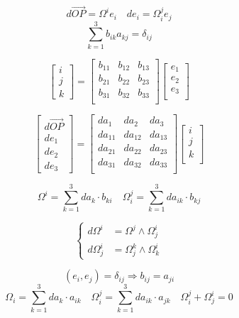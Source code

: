 \documentclass[12pt,a4paper]{article}
\begin{document}
\[
d\overrightarrow{OP} = \Omega^ie_i \quad de_i = \Omega^j_ie_j
\]
\[
\sum_{k = 1} ^3 b_{ik}a_{kj} = \delta_{ij}
\]

\[
\left[
\begin{array}{c}
i \\ j \\ k
\end{array}
\right] = \left[
\begin{array}{ccc}
b_{11} & b_{12} & b_{13} \\
b_{21} & b_{22} & b_{23} \\
b_{31} & b_{32} & b_{33} \\
\end{array}
\right] \left[
\begin{array}{c}
e_1\\e_2\\e_3\\
\end{array}
\right]
\]

\[
\left[
\begin{array}{c}
d\overrightarrow{OP} \\ de_1 \\de_2 \\de_3
\end{array}
\right] = \left[
\begin{array}{ccc}
da_1 & da_2 & da_3 \\
da_{11} & da_{12} & da_{13} \\
da_{21} & da_{22} & da_{23} \\
da_{31} & da_{32} & da_{33} \\
\end{array}
\right] \left[
\begin{array}{c}
i \\j\\k\\
\end{array}
\right]
\]

\[
\Omega^i = \sum_{k = 1}^3 da_{k} \cdot b_{ki}
\quad
\Omega_i^j = \sum_{k = 1}^3 da_{ik}\cdot b_{kj}
\]

\[
\begin{cases}
d\Omega^i & =  \Omega^j \wedge \Omega^i_j \\
d\Omega^i_j &=  \Omega^k_j \wedge \Omega^i_k
\end{cases}
\]

\[
(e_i,e_j) = \delta_{ij}  \Rightarrow b_{ij} = a_{ji}
\]
\[
\Omega_i = \sum_{k = 1}^3 da_{k} \cdot a_{ik}
\quad
\Omega_i^j = \sum_{k = 1}^3 da_{ik}\cdot a_{jk}
\quad
\Omega_i^j + \Omega_j^i = 0
\]
\end{document}
